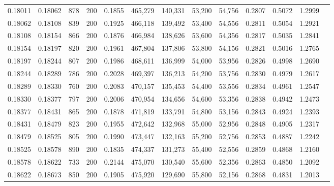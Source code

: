 \begin{tabular}{rrrrrrrrrrrrr}
0.18011 & 0.18062 &   878 & 200 &                                     0.1855 & 465,279 & 140,331 &  53,200 &  54,756 & 0.2807 & 0.5072 & 1.2999 \\
0.18062 & 0.18108 &   839 & 200 &                                     0.1925 & 466,118 & 139,492 &  53,400 &  54,556 & 0.2811 & 0.5054 & 1.2921 \\
0.18108 & 0.18154 &   866 & 200 &                                     0.1876 & 466,984 & 138,626 &  53,600 &  54,356 & 0.2817 & 0.5035 & 1.2841 \\
0.18154 & 0.18197 &   820 & 200 &                                     0.1961 & 467,804 & 137,806 &  53,800 &  54,156 & 0.2821 & 0.5016 & 1.2765 \\
0.18197 & 0.18244 &   807 & 200 &                                     0.1986 & 468,611 & 136,999 &  54,000 &  53,956 & 0.2826 & 0.4998 & 1.2690 \\
0.18244 & 0.18289 &   786 & 200 &                                     0.2028 & 469,397 & 136,213 &  54,200 &  53,756 & 0.2830 & 0.4979 & 1.2617 \\
0.18289 & 0.18330 &   760 & 200 &                                     0.2083 & 470,157 & 135,453 &  54,400 &  53,556 & 0.2834 & 0.4961 & 1.2547 \\
0.18330 & 0.18377 &   797 & 200 &                                     0.2006 & 470,954 & 134,656 &  54,600 &  53,356 & 0.2838 & 0.4942 & 1.2473 \\
0.18377 & 0.18431 &   865 & 200 &                                     0.1878 & 471,819 & 133,791 &  54,800 &  53,156 & 0.2843 & 0.4924 & 1.2393 \\
0.18431 & 0.18479 &   823 & 200 &                                     0.1955 & 472,642 & 132,968 &  55,000 &  52,956 & 0.2848 & 0.4905 & 1.2317 \\
0.18479 & 0.18525 &   805 & 200 &                                     0.1990 & 473,447 & 132,163 &  55,200 &  52,756 & 0.2853 & 0.4887 & 1.2242 \\
0.18525 & 0.18578 &   890 & 200 &                                     0.1835 & 474,337 & 131,273 &  55,400 &  52,556 & 0.2859 & 0.4868 & 1.2160 \\
0.18578 & 0.18622 &   733 & 200 &                                     0.2144 & 475,070 & 130,540 &  55,600 &  52,356 & 0.2863 & 0.4850 & 1.2092 \\
0.18622 & 0.18673 &   850 & 200 &                                     0.1905 & 475,920 & 129,690 &  55,800 &  52,156 & 0.2868 & 0.4831 & 1.2013 \\

\end{tabular}
